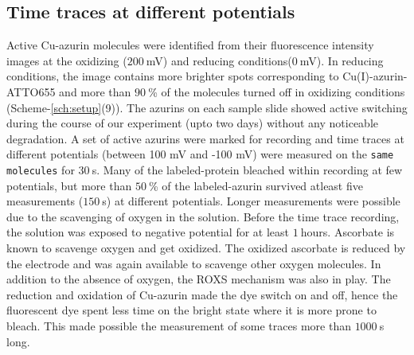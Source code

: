\documentclass[journal=jacsat,manuscript=article]{achemso}
\begin{document}
\subsection{Time traces at different potentials}
Active Cu-azurin molecules were identified from their fluorescence intensity images at the oxidizing ($200~$mV) and reducing conditions($0~$mV). In reducing conditions, the image contains more brighter spots corresponding to Cu(I)-azurin-ATTO655 and more than $90~$\% of the molecules turned off in oxidizing conditions (Scheme-\ref{sch:setup}(9)). The azurins on each sample slide showed active switching during the course of our experiment (upto two days) without any noticeable degradation. A set of active azurins were marked for recording and time traces at different potentials (between 100 mV and -100 mV) were measured on the \texttt{same molecules} for $30~$s. Many of the labeled-protein bleached within recording at few potentials, but more than $50~$\% of the labeled-azurin survived atleast five measurements ($150~$s) at different potentials. Longer measurements were possible due to the scavenging of oxygen in the solution. Before the time trace recording, the solution was exposed to negative potential for at least $1~$hours. Ascorbate is known to  scavenge oxygen\cite{dave1997effectiveness} and get oxidized. The oxidized ascorbate is reduced by the electrode and was again available to scavenge other oxygen molecules. In addition to the absence of oxygen, the ROXS mechanism was also in play. The reduction and oxidation of Cu-azurin made the dye switch on and off, hence the fluorescent dye spent less time on the bright state where it is more prone to bleach. This made possible the measurement of some traces more than $1000~$s long.\\
\end{document}
